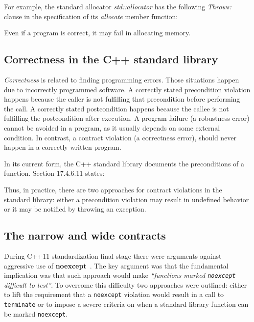For example, the standard allocator \emph{std::allocator} has the following \emph{Throws:}
clause in the specification of its \emph{allocate} member function:

\vspace{1em}
\noindent
{}
\vspace{1em}

Even if a program is correct, it may fail in allocating memory.

\subsection{Correctness in the C++ standard library}

\emph{Correctness} is related to finding programming errors. Those situations happen
due to incorrectly programmed software. A correctly stated precondition
violation happens because the caller is not fulfilling that precondition before
performing the call. A correctly stated postcondition happens because the callee
is not fulfilling the postcondition after execution. A program failure (a
robustness error) cannot be avoided in a program, as it usually depends
on some external condition. In contrast, a contract violation (a correctness
error), should never happen in a correctly written program.

In its current form, the C++ standard library documents the preconditions of a function.
Section 17.4.6.11 states:

\vspace{1em}
\noindent
{}
\vspace{1em}

Thus, in practice, there are two approaches for contract violations in the
standard library: either a precondition violation may result in undefined behavior
or it may be notified by throwing an exception.

\subsection{The narrow and wide contracts}

During C++11 standardization final stage there were arguments against aggressive
use of \textbf{noexcept}~\cite{n3248}. The key argument was that the fundamental
implication was that such approach would make \emph{``functions marked
\texttt{noexcept} difficult to test''}.  To overcome this difficulty two
approaches were outlined: either to lift the requirement that a
\texttt{noexcept} violation would result in a call to \texttt{terminate} or to
impose a severe criteria on when a standard library function can be marked
\texttt{noexcept}.

